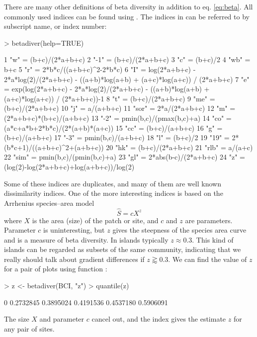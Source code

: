 \documentclass[a4paper,10pt,twocolumn]{article}
\begin{document}
There are many other definitions of beta diversity in addition to
eq. \ref{eq:beta}.  All commonly used indices can be found using
 \citep{KoleffEtal03}. The indices in 
can be referred to by subscript name, or index number:
\begin{Schunk}
\begin{Sinput}
> betadiver(help=TRUE)
\end{Sinput}
\begin{Soutput}
1 "w" = (b+c)/(2*a+b+c)
2 "-1" = (b+c)/(2*a+b+c)
3 "c" = (b+c)/2
4 "wb" = b+c
5 "r" = 2*b*c/((a+b+c)^2-2*b*c)
6 "I" = log(2*a+b+c) - 2*a*log(2)/(2*a+b+c) -
((a+b)*log(a+b) + (a+c)*log(a+c)) / (2*a+b+c)
7 "e" = exp(log(2*a+b+c) - 2*a*log(2)/(2*a+b+c)
- ((a+b)*log(a+b) + (a+c)*log(a+c)) /
(2*a+b+c))-1
8 "t" = (b+c)/(2*a+b+c)
9 "me" = (b+c)/(2*a+b+c)
10 "j" = a/(a+b+c)
11 "sor" = 2*a/(2*a+b+c)
12 "m" = (2*a+b+c)*(b+c)/(a+b+c)
13 "-2" = pmin(b,c)/(pmax(b,c)+a)
14 "co" = (a*c+a*b+2*b*c)/(2*(a+b)*(a+c))
15 "cc" = (b+c)/(a+b+c)
16 "g" = (b+c)/(a+b+c)
17 "-3" = pmin(b,c)/(a+b+c)
18 "l" = (b+c)/2
19 "19" = 2*(b*c+1)/((a+b+c)^2+(a+b+c))
20 "hk" = (b+c)/(2*a+b+c)
21 "rlb" = a/(a+c)
22 "sim" = pmin(b,c)/(pmin(b,c)+a)
23 "gl" = 2*abs(b-c)/(2*a+b+c)
24 "z" = (log(2)-log(2*a+b+c)+log(a+b+c))/log(2)
\end{Soutput}
\end{Schunk}
Some of these indices are duplicates, and many of them are well known
dissimilarity indices.
One of the more interesting indices is based
on the Arrhenius species--area model
\begin{equation}
  \label{eq:arrhenius}
  \hat S = c X^z
\end{equation}
where $X$ is the area (size) of the patch or site, and $c$ and $z$ are
parameters. Parameter $c$ is uninteresting, but $z$ gives the
steepness of the species area curve and is a measure of beta
diversity. In islands typically  $z \approx 0.3$. This kind of
islands can be regarded as subsets of the same community, indicating
that we really should talk about gradient differences if $z \gtrapprox 0.3$. We
can find the value of $z$ for a pair of plots using function
:
\begin{Schunk}
\begin{Sinput}
> z <- betadiver(BCI, "z")
> quantile(z)
\end{Sinput}
\begin{Soutput}
       0%       25%       50%       75%      100% 
0.2732845 0.3895024 0.4191536 0.4537180 0.5906091 
\end{Soutput}
\end{Schunk}
The size $X$ and parameter $c$ cancel out, and the index gives the
estimate $z$ for any pair of sites.
\end{document}
